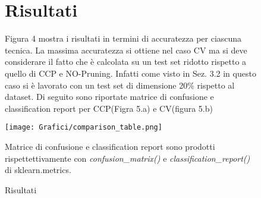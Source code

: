 \documentclass[]{article}
\begin{document}
\begin{figure}
\section{Risultati }
Figura 4 mostra i risultati in termini di accuratezza per ciascuna tecnica.
La massima accuratezza si ottiene nel caso CV ma si deve considerare il fatto che è calcolata su un test set ridotto rispetto a quello di CCP e NO-Pruning. Infatti come visto in Sez. 3.2 in questo caso si è lavorato con un test set di dimensione 20\% rispetto al dataset.
Di seguito sono riportate matrice di confusione e classification report per CCP(Figra 5.a) e CV(figura 5.b)
\\
\begin{center}
\texttt{[image: Grafici/comparison\_table.png]} 

\caption{Risultati}
\end{center}
Matrice di confusione e classification report sono prodotti rispettettivamente con \textit{confusion\_matrix()} e \textit{classification\_report()} di sklearn.metrics.
\end{figure}
\end{document}
